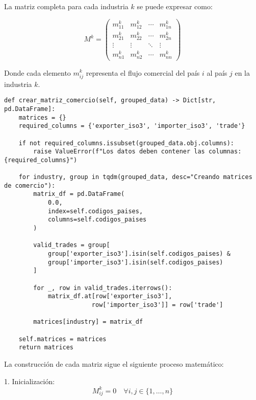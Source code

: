 \documentclass[11pt,a4paper]{article}
\begin{document}
La matriz completa para cada industria $k$ se puede expresar como:

\begin{equation}
M^k = \begin{pmatrix}
m_{11}^k & m_{12}^k & \cdots & m_{1n}^k \\
m_{21}^k & m_{22}^k & \cdots & m_{2n}^k \\
\vdots & \vdots & \ddots & \vdots \\
m_{n1}^k & m_{n2}^k & \cdots & m_{nn}^k
\end{pmatrix}
\end{equation}

Donde cada elemento $m_{ij}^k$ representa el flujo comercial del país $i$ al país $j$ en la industria $k$.

\begin{tcolorbox}[colback=codebackground,title=Implementación del Método]
\begin{lstlisting}
def crear_matriz_comercio(self, grouped_data) -> Dict[str, pd.DataFrame]:
    matrices = {}
    required_columns = {'exporter_iso3', 'importer_iso3', 'trade'}
    
    if not required_columns.issubset(grouped_data.obj.columns):
        raise ValueError(f"Los datos deben contener las columnas: {required_columns}")
    
    for industry, group in tqdm(grouped_data, desc="Creando matrices de comercio"):
        matrix_df = pd.DataFrame(
            0.0,
            index=self.codigos_paises,
            columns=self.codigos_paises
        )
        
        valid_trades = group[
            group['exporter_iso3'].isin(self.codigos_paises) & 
            group['importer_iso3'].isin(self.codigos_paises)
        ]
        
        for _, row in valid_trades.iterrows():
            matrix_df.at[row['exporter_iso3'], 
                        row['importer_iso3']] = row['trade']
        
        matrices[industry] = matrix_df
    
    self.matrices = matrices
    return matrices
\end{lstlisting}
\end{tcolorbox}

La construcción de cada matriz sigue el siguiente proceso matemático:

1. Inicialización:
   \begin{equation}
   M^k_{ij} = 0 \quad \forall i,j \in \{1,\ldots,n\}
   \end{equation}
\end{document}
